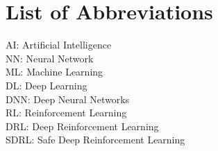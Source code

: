 

{
\tableofcontents
}

\blankpage

{
\listoffigures 
}




\blankpage

\listoftables 

\blankpage

{\section*{List of Abbreviations}}

\begin{textblock}
AI: Artificial Intelligence\\
NN: Neural Network\\
ML: Machine Learning\\
DL: Deep Learning\\
DNN: Deep Neural Networks\\
RL: Reinforcement Learning\\
DRL: Deep Reinforcement Learning\\
SDRL: Safe Deep Reinforcement Learning\\
\end{textblock}

\blankpage